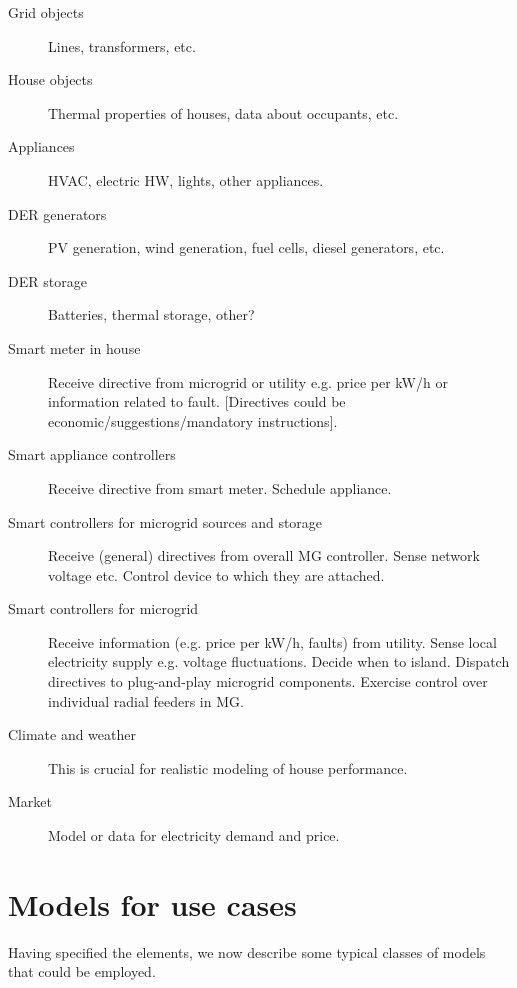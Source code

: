 \documentclass[12pt]{article}
\begin{document}
\begin{description}

\item[Grid objects] Lines, transformers, etc.

\item[House objects] Thermal properties of houses, data about occupants, etc.

\item[Appliances] HVAC, electric HW, lights, other appliances.

\item[DER generators] PV generation, wind generation, fuel cells, diesel generators, etc. 

\item[DER storage] Batteries, thermal storage, other? 

\item[Smart meter in house] Receive directive from microgrid or utility e.g. price per kW/h or information related to fault. [Directives could be economic/suggestions/mandatory instructions].

\item[Smart appliance controllers]
Receive directive from smart meter. Schedule appliance.

\item[Smart controllers for microgrid sources and storage] Receive (general) directives from overall MG controller. Sense network voltage etc. Control device to which they are attached.

\item[Smart controllers for microgrid] Receive information (e.g. price per kW/h, faults) from utility. Sense local electricity supply e.g. voltage fluctuations. Decide when to island. Dispatch directives to plug-and-play microgrid components. Exercise control over individual radial feeders in MG.

\item[Climate and weather] This is crucial for realistic modeling of house performance.

\item[Market] Model or data for electricity demand and price.

\end{description}

\section{Models for use cases}
Having specified the elements, we now describe some typical classes of models that could be employed.
\end{document}
